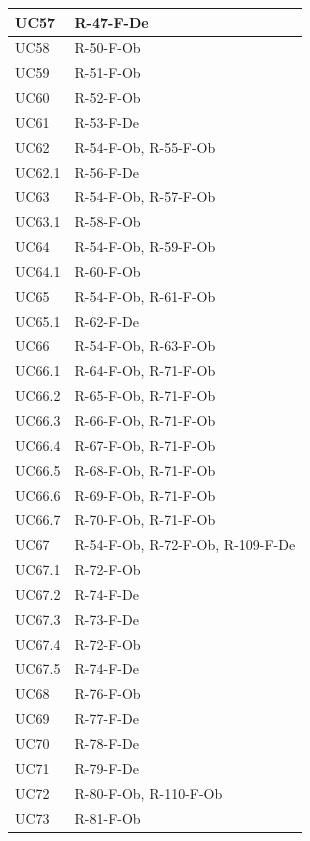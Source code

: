 \documentclass[a4paper, 10pt]{article}
\begin{document}
\begin{longtable}{|p{2.8cm}|p{10cm}|}
        UC57 & R-47-F-De \\ \hline
        UC58 & R-50-F-Ob \\ \hline
        UC59 & R-51-F-Ob \\ \hline
        UC60 & R-52-F-Ob \\ \hline
        UC61 & R-53-F-De \\ \hline
        UC62 & R-54-F-Ob, R-55-F-Ob \\ \hline
        UC62.1 & R-56-F-De \\ \hline
        UC63 & R-54-F-Ob, R-57-F-Ob \\ \hline
        UC63.1 & R-58-F-Ob \\ \hline
        UC64 & R-54-F-Ob, R-59-F-Ob \\ \hline
        UC64.1 & R-60-F-Ob \\ \hline
        UC65 & R-54-F-Ob, R-61-F-Ob \\ \hline
        UC65.1 & R-62-F-De \\ \hline
        UC66 & R-54-F-Ob, R-63-F-Ob \\ \hline
        UC66.1 & R-64-F-Ob, R-71-F-Ob \\ \hline
        UC66.2 & R-65-F-Ob, R-71-F-Ob \\ \hline
        UC66.3 & R-66-F-Ob, R-71-F-Ob \\ \hline
        UC66.4 & R-67-F-Ob, R-71-F-Ob \\ \hline
        UC66.5 & R-68-F-Ob, R-71-F-Ob \\ \hline
        UC66.6 & R-69-F-Ob, R-71-F-Ob \\ \hline
        UC66.7 & R-70-F-Ob, R-71-F-Ob \\ \hline
        UC67 & R-54-F-Ob, R-72-F-Ob, R-109-F-De \\ \hline
        UC67.1 & R-72-F-Ob \\ \hline
        UC67.2 & R-74-F-De \\ \hline
        UC67.3 & R-73-F-De \\ \hline
        UC67.4 & R-72-F-Ob \\ \hline
        UC67.5 & R-74-F-De \\ \hline
        UC68 & R-76-F-Ob \\ \hline
        UC69 & R-77-F-De \\ \hline
        UC70 & R-78-F-De \\ \hline
        UC71 & R-79-F-De \\ \hline
        UC72 & R-80-F-Ob, R-110-F-Ob \\ \hline
        UC73 & R-81-F-Ob \\ \hline

\end{longtable}
\end{document}
